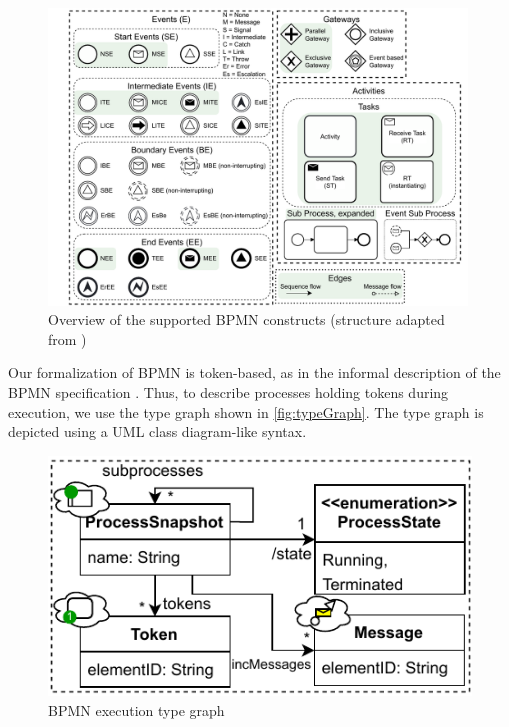 \documentclass[runningheads]{llncs}
\begin{document}
\begin{figure}[ht]
    \centering
    \includegraphics[width=0.99\textwidth]{images/bpmn_semantics-feature-overview.pdf}
    \caption{Overview of the supported BPMN constructs (structure adapted from \cite{houhouFirstOrderLogicVerification2022})}
    \label{fig:bpmnConstructsOverview}
\end{figure}

Our formalization of BPMN is token-based, as in the informal description of the BPMN specification \cite{objectmanagementgroupBusinessProcessModel2013}.
Thus, to describe processes holding tokens during execution, we use the type graph shown in \autoref{fig:typeGraph}.
The type graph is depicted using a UML class diagram-like syntax.

\begin{figure}[ht]
  \centering
  \includegraphics[width=0.5\linewidth]{images/bpmn_semantics-typegraph.pdf}
  \caption{BPMN execution type graph}
  \label{fig:typeGraph}
\end{figure}
\end{document}
